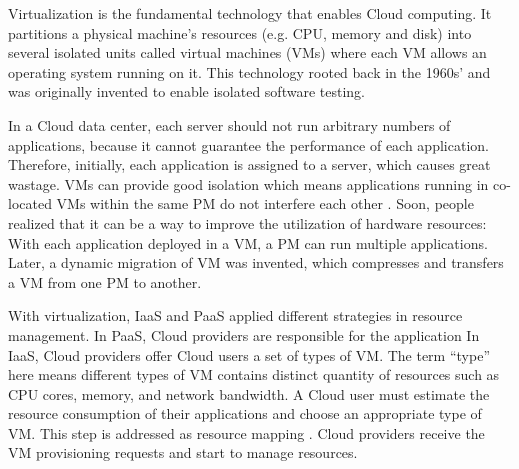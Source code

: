 Virtualization \cite{Uhlig:2005do} is the fundamental technology that enables Cloud computing. It partitions a physical machine's resources (e.g. CPU, memory and disk) into several isolated units called virtual machines (VMs) where each VM allows an operating system running on it. This technology rooted back in the 1960s' and was originally invented to enable isolated software testing.

In a Cloud data center, each server should not run arbitrary numbers of applications, because it cannot guarantee the performance of each application. Therefore, initially, each application is assigned to a server, which causes great wastage.
VMs can provide good isolation which means applications running in co-located VMs within the same PM do not interfere each other \cite{Somani:2009ho}.  Soon, people realized that it can be a way to improve the utilization of hardware resources: With each application deployed in a VM, a PM can run multiple applications. Later, a dynamic migration of VM was invented, which compresses and transfers a VM from one PM to another. 


With virtualization, IaaS and PaaS applied different strategies in resource management.
In PaaS, Cloud providers are responsible for the application 
In IaaS, Cloud providers offer Cloud users a set of types of VM. The term ``type'' here means different types of VM contains distinct quantity of resources such as CPU cores, memory, and network bandwidth. A Cloud user must estimate the resource consumption of their applications and choose an appropriate type of VM.
This step is addressed as resource mapping \cite{}. Cloud providers receive the VM provisioning requests and start to manage resources. 

